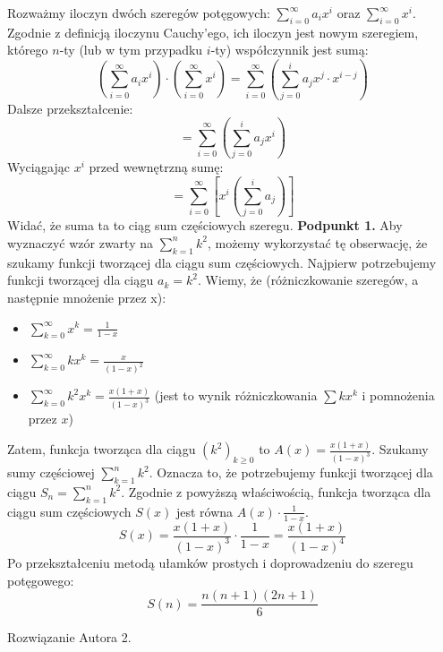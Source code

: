 \documentclass{mwart}
\begin{document}
\begin{mdframed}
    Rozważmy iloczyn dwóch szeregów potęgowych: $\sum_{i=0}^{\infty} a_i x^i$ oraz $\sum_{i=0}^{\infty} x^i$.
    Zgodnie z definicją iloczynu Cauchy'ego, ich iloczyn jest nowym szeregiem, którego $n$-ty (lub w tym przypadku $i$-ty) współczynnik jest sumą:
    $$ \left( \sum_{i=0}^{\infty} a_i x^i \right) \cdot \left( \sum_{i=0}^{\infty} x^i \right) = \sum_{i=0}^{\infty} \left( \sum_{j=0}^{i} a_j x^j \cdot x^{i-j} \right) $$
    Dalsze przekształcenie:
    $$ = \sum_{i=0}^{\infty} \left( \sum_{j=0}^{i} a_j x^i \right) $$
    Wyciągając $x^i$ przed wewnętrzną sumę:
    $$ = \sum_{i=0}^{\infty} \left[ x^i \left( \sum_{j=0}^{i} a_j \right) \right] $$
    Widać, że suma ta to ciąg sum częściowych szeregu.
    \newline\textbf{Podpunkt 1.} \newline
    Aby wyznaczyć wzór zwarty na $\sum_{k=1}^n k^2$, możemy wykorzystać tę obserwację, że szukamy funkcji tworzącej dla ciągu sum częściowych.
    Najpierw potrzebujemy funkcji tworzącej dla ciągu $a_k = k^2$.
    Wiemy, że (różniczkowanie szeregów, a następnie mnożenie przez x):
    \begin{itemize}
        \item $\sum_{k=0}^{\infty} x^k = \frac{1}{1-x}$
        \item $\sum_{k=0}^{\infty} k x^k = \frac{x}{(1-x)^2}$
        \item $\sum_{k=0}^{\infty} k^2 x^k = \frac{x(1+x)}{(1-x)^3}$ (jest to wynik różniczkowania $\sum kx^k$ i pomnożenia przez $x$)
    \end{itemize}
    Zatem, funkcja tworząca dla ciągu $(k^2)_{k \ge 0}$ to $A(x) = \frac{x(1+x)}{(1-x)^3}$.
    Szukamy sumy częściowej $\sum_{k=1}^n k^2$. Oznacza to, że potrzebujemy funkcji tworzącej dla ciągu $S_n = \sum_{k=1}^n k^2$.
    Zgodnie z powyższą właściwością, funkcja tworząca dla ciągu sum częściowych $S(x)$ jest równa $A(x) \cdot \frac{1}{1-x}$.
    $$S(x) = \frac{x(1+x)}{(1-x)^3} \cdot \frac{1}{1-x} = \frac{x(1+x)}{(1-x)^4}$$
    Po przekształceniu metodą ułamków prostych i doprowadzeniu do szeregu potęgowego:
    $$S(n) = \frac{n(n+1)(2n+1)}{6}$$
\end{mdframed}
\begin{mdframed}
    Rozwiązanie Autora 2.
\end{mdframed}
\end{document}
